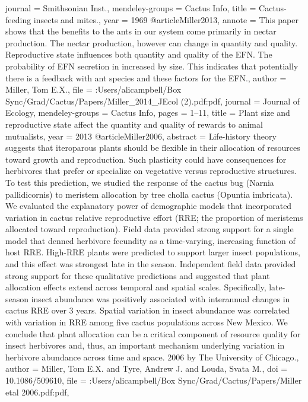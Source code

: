 {{journal = {Smithsonian Inst.},
mendeley-groups = {Cactus Info},
title = {{Cactus-feeding insects and mites.}},
year = {1969}
}
@article{Miller2013,
annote = {This paper shows that the benefits to the ants in our system come primarily in nectar production. The nectar production, however can change in quantity and quality. Reproductive state influences both quantity and quality of the EFN. The probability of EFN secretion in increased by size. This indicates that potentially there is a feedback with ant species and these factors for the EFN.},
author = {Miller, Tom E.X.},
file = {:Users/alicampbell/Box Sync/Grad/Cactus/Papers/Miller_2014_JEcol (2).pdf:pdf},
journal = {Journal of Ecology},
mendeley-groups = {Cactus Info},
pages = {1--11},
title = {{Plant size and reproductive state affect the quantity and quality of rewards to animal mutualists}},
year = {2013}
}
@article{Miller2006,
abstract = {Life-history theory suggests that iteroparous plants should be flexible in their allocation of resources toward growth and reproduction. Such plasticity could have consequences for herbivores that prefer or specialize on vegetative versus reproductive structures. To test this prediction, we studied the response of the cactus bug (Narnia pallidicornis) to meristem allocation by tree cholla cactus (Opuntia imbricata). We evaluated the explanatory power of demographic models that incorporated variation in cactus relative reproductive effort (RRE; the proportion of meristems allocated toward reproduction). Field data provided strong support for a single model that denned herbivore fecundity as a time-varying, increasing function of host RRE. High-RRE plants were predicted to support larger insect populations, and this effect was strongest late in the season. Independent field data provided strong support for these qualitative predictions and suggested that plant allocation effects extend across temporal and spatial scales. Specifically, late-season insect abundance was positively associated with interannual changes in cactus RRE over 3 years. Spatial variation in insect abundance was correlated with variation in RRE among five cactus populations across New Mexico. We conclude that plant allocation can be a critical component of resource quality for insect herbivores and, thus, an important mechanism underlying variation in herbivore abundance across time and space. {\textcopyright} 2006 by The University of Chicago.},
author = {Miller, Tom E.X. and Tyre, Andrew J. and Louda, Svata M.},
doi = {10.1086/509610},
file = {:Users/alicampbell/Box Sync/Grad/Cactus/Papers/Miller etal 2006.pdf:pdf},
}}

